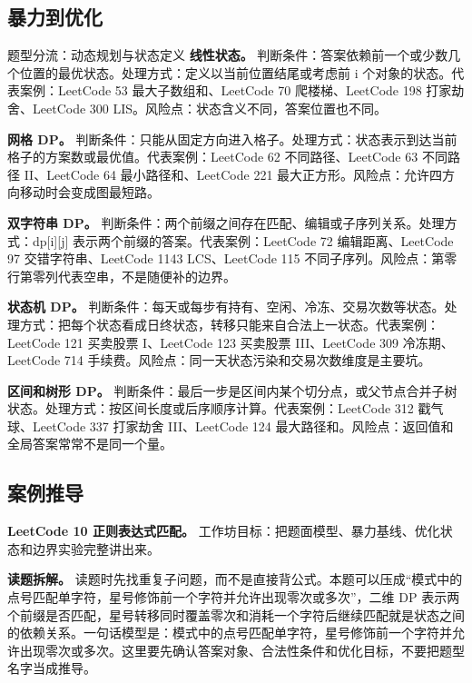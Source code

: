 \subsection{暴力到优化}

\begin{principlebox}{题型分流：动态规划与状态定义}
\textbf{线性状态。}
判断条件：答案依赖前一个或少数几个位置的最优状态。处理方式：定义以当前位置结尾或考虑前 i 个对象的状态。代表案例：LeetCode 53 最大子数组和、LeetCode 70 爬楼梯、LeetCode 198 打家劫舍、LeetCode 300 LIS。风险点：状态含义不同，答案位置也不同。

\textbf{网格 DP。}
判断条件：只能从固定方向进入格子。处理方式：状态表示到达当前格子的方案数或最优值。代表案例：LeetCode 62 不同路径、LeetCode 63 不同路径 II、LeetCode 64 最小路径和、LeetCode 221 最大正方形。风险点：允许四方向移动时会变成图最短路。

\textbf{双字符串 DP。}
判断条件：两个前缀之间存在匹配、编辑或子序列关系。处理方式：dp[i][j] 表示两个前缀的答案。代表案例：LeetCode 72 编辑距离、LeetCode 97 交错字符串、LeetCode 1143 LCS、LeetCode 115 不同子序列。风险点：第零行第零列代表空串，不是随便补的边界。

\textbf{状态机 DP。}
判断条件：每天或每步有持有、空闲、冷冻、交易次数等状态。处理方式：把每个状态看成日终状态，转移只能来自合法上一状态。代表案例：LeetCode 121 买卖股票 I、LeetCode 123 买卖股票 III、LeetCode 309 冷冻期、LeetCode 714 手续费。风险点：同一天状态污染和交易次数维度是主要坑。

\textbf{区间和树形 DP。}
判断条件：最后一步是区间内某个切分点，或父节点合并子树状态。处理方式：按区间长度或后序顺序计算。代表案例：LeetCode 312 戳气球、LeetCode 337 打家劫舍 III、LeetCode 124 最大路径和。风险点：返回值和全局答案常常不是同一个量。

\end{principlebox}

\subsection{案例推导}

\noindent\textbf{LeetCode 10 正则表达式匹配。} 工作坊目标：把题面模型、暴力基线、优化状态和边界实验完整讲出来。

\textbf{读题拆解。} 读题时先找重复子问题，而不是直接背公式。本题可以压成“模式中的点号匹配单字符，星号修饰前一个字符并允许出现零次或多次”，二维 DP 表示两个前缀是否匹配，星号转移同时覆盖零次和消耗一个字符后继续匹配就是状态之间的依赖关系。一句话模型是：模式中的点号匹配单字符，星号修饰前一个字符并允许出现零次或多次。这里要先确认答案对象、合法性条件和优化目标，不要把题型名字当成推导。

